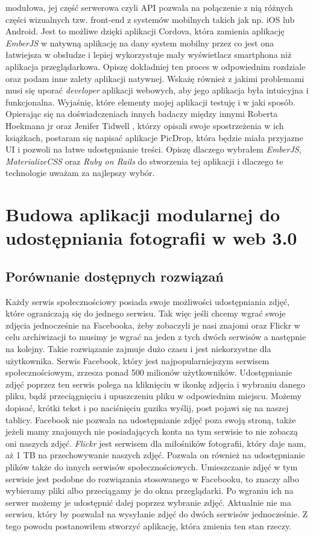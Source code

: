 \documentclass[brudnopis]{xmgr}
\begin{document}
modułowa, jej część serwerowa czyli API pozwala na połączenie z nią różnych części wizualnych tzw. front-end z systemów mobilnych takich jak np. iOS lub Android. Jest to możliwe dzięki aplikacji Cordova, która zamienia aplikację \textit{EmberJS} w natywną aplikację na dany system mobilny przez co jest ona łatwiejsza w obsłudze i lepiej wykorzystuje mały wyświetlacz smartphona niż aplikacja przeglądarkowa. Opiszę dokładniej ten proces w odpowiednim rozdziale oraz podam inne zalety aplikacji natywnej. Wskażę również z jakimi problemami musi się uporać \textit{developer} aplikacji webowych, aby jego aplikacja była intuicyjna i funkcjonalna. Wyjaśnię, które elementy mojej aplikacji testuję i w jaki sposób. Opierając się na  doświadczeniach innych badaczy  między innymi Roberta Hoekmana jr  \cite {magiaUI} oraz Jenifer Tidwell  \cite {projektowanieUI}, którzy opisali swoje spostrzeżenia w ich książkach, postaram się napisać aplikacje PicDrop, która  będzie miała przyjazne UI i pozwoli na łatwe udostępnianie treści. Opiszę dlaczego wybrałem \textit{EmberJS}, \textit{MaterializeCSS} oraz \textit{Ruby on Rails} do stworzenia tej aplikacji i dlaczego te technologie uważam za najlepszy wybór.


\chapter{Budowa aplikacji modularnej do udostępniania fotografii  w web 3.0}

\section{Porównanie dostępnych rozwiązań}
Każdy serwis społecznościowy posiada swoje możliwości udostępniania zdjęć, które ograniczają się do jednego serwisu. Tak więc jeśli chcemy wgrać swoje zdjęcia jednocześnie na Facebooka, żeby zobaczyli je nasi znajomi oraz Flickr w celu archiwizacji to musimy je wgrać na jeden z tych dwóch serwisów a następnie na kolejny. Takie rozwiązanie zajmuje dużo czasu i jest niekorzystne dla użytkownika. Serwis Facebook, który jest najpopularniejszym serwisem społecznościowym, zrzesza ponad 500 milionów użytkowników. Udostępnianie zdjęć poprzez ten serwis polega na kliknięciu w ikonkę zdjęcia i wybraniu danego pliku, bądź przeciągnięciu i upuszczeniu pliku w odpowiednim miejscu. Możemy dopisać, krótki tekst i po naciśnięciu guzika wyślij, post pojawi się na naszej tablicy. Facebook nie pozwala na udostępnianie zdjęć poza swoją stroną, także jeżeli mamy znajomych nie posiadających konta na tym serwisie to nie zobaczą oni naszych zdjęć. \newline \indent \textit{Flickr} jest serwisem dla miłośników fotografii, który daje nam, aż 1 TB na przechowywanie naszych zdjęć. Pozwala on również na udostępnianie plików także do innych serwisów społecznościowych. Umieszczanie zdjęć w tym serwisie jest podobne do rozwiązania stosowanego w Facebooku, to znaczy albo wybieramy pliki albo przeciągamy je do okna przeglądarki. Po wgraniu ich na serwer możemy je udostępnić dalej poprzez wybranie zdjęć. Aktualnie nie ma serwisu, który by pozwalał na wysyłanie zdjęć do dwóch serwisów jednocześnie. Z tego powodu postanowiłem stworzyć aplikację, która zmienia ten stan rzeczy.
\end{document}

